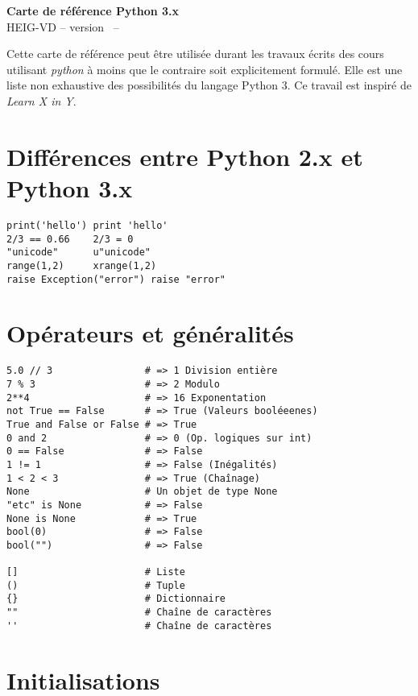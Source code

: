 \documentclass{article}
\begin{document}
\begin{multicols*}{4}

\begin{center}
  {\Large \bf Carte de référence Python 3.x} \\
  HEIG-VD -- version \revision \ -- \revisiondate \\
\end{center}

Cette carte de référence peut être utilisée durant les travaux écrits
des cours utilisant \emph{python} à moins que le contraire soit explicitement formulé. Elle est une liste non exhaustive des possibilités du langage Python 3. Ce travail est inspiré de \emph{Learn X in Y}.

\section*{Différences entre Python 2.x et Python 3.x}

\begin{lstlisting}
print('hello') print 'hello'
2/3 == 0.66    2/3 = 0
"unicode"      u"unicode"
range(1,2)     xrange(1,2)
raise Exception("error") raise "error"
\end{lstlisting}

\section*{Opérateurs et généralités}

\begin{lstlisting}
5.0 // 3                # => 1 Division entière
7 % 3                   # => 2 Modulo
2**4                    # => 16 Exponentation
not True == False       # => True (Valeurs booléeenes)
True and False or False # => True 
0 and 2                 # => 0 (Op. logiques sur int)
0 == False              # => False 
1 != 1                  # => False (Inégalités)
1 < 2 < 3               # => True (Chaînage)
None                    # Un objet de type None
"etc" is None           # => False
None is None            # => True
bool(0)                 # => False
bool("")                # => False

[]                      # Liste 
()                      # Tuple 
{}                      # Dictionnaire
""                      # Chaîne de caractères
''                      # Chaîne de caractères
\end{lstlisting}

\section*{Initialisations}


\end{multicols*}
\end{document}
